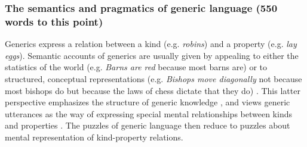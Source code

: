 \documentclass[10pt,letterpaper]{article}
\begin{document}
\subsubsection*{The semantics and pragmatics of generic language  (550 words to this point)}

Generics express a relation between a kind (e.g. \emph{robins}) and a property (e.g. \emph{lay eggs}). 
Semantic accounts of generics are usually given by appealing to either the statistics of the world (e.g. \emph{Barns are red} because most barns are) or to structured, conceptual representations (e.g. \emph{Bishops move diagonally} not because most bishops do but because the laws of chess dictate that they do) \cite{Carlson1995essay}. 
This latter perspective emphasizes the structure of generic knowledge \cite{Prasada2000}, and views generic utterances as the way of expressing special mental relationships between kinds and properties \cite{Leslie2008, Prasada2012}. The puzzles of generic language then reduce to puzzles about mental representation of kind-property relations.

%


\end{document}
